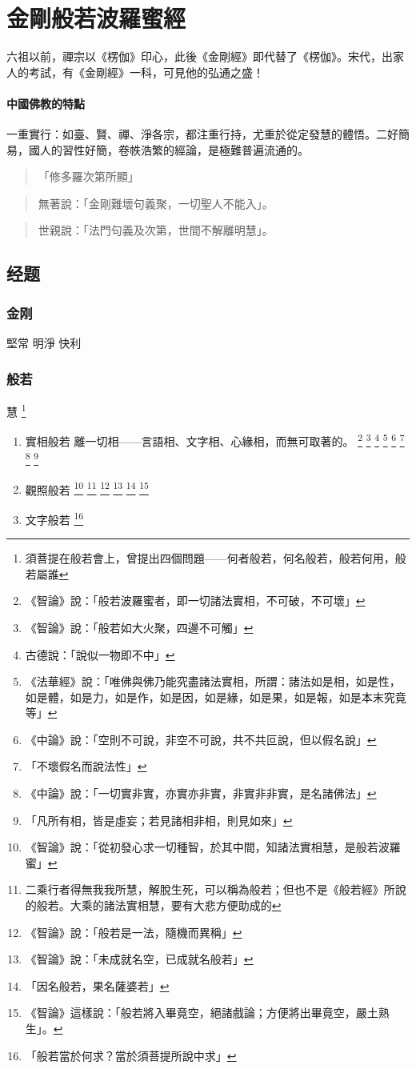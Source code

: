 \section{金剛般若波羅蜜經}
六祖以前，禪宗以《楞伽》印心，此後《金剛經》即代替了《楞伽》。宋代，出家人的考試，有《金剛經》一科，可見他的弘通之盛！
\paragraph{中國佛教的特點}
一重實行：如臺、賢、禪、淨各宗，都注重行持，尤重於從定發慧的體悟。二好簡易，國人的習性好簡，卷帙浩繁的經論，是極難普遍流通的。

\begin{quote}
  「修多羅次第所顯」
\end{quote}

\begin{quote}
  無著說：「金剛難壞句義聚，一切聖人不能入」。
\end{quote}

\begin{quote}
  世親說：「法門句義及次第，世間不解離明慧」。
\end{quote}

\subsection{经题}
\subsubsection{金刚} 堅常 明淨 快利
\subsubsection{般若} 慧 \footnote{須菩提在般若會上，曾提出四個問題——何者般若，何名般若，般若何用，般若屬誰}
\begin{enumerate}
  \item 實相般若 離一切相——言語相、文字相、心緣相，而無可取著的。
    \footnote{《智論》說：「般若波羅蜜者，即一切諸法實相，不可破，不可壞」}
    \footnote{《智論》說：「般若如大火聚，四邊不可觸」}
    \footnote{古德說：「說似一物即不中」}
    \footnote{《法華經》說：「唯佛與佛乃能究盡諸法實相，所謂：諸法如是相，如是性，如是體，如是力，如是作，如是因，如是緣，如是果，如是報，如是本末究竟等」}
    \footnote{《中論》說：「空則不可說，非空不可說，共不共叵說，但以假名說」}
    \footnote{「不壞假名而說法性」}
    \footnote{《中論》說：「一切實非實，亦實亦非實，非實非非實，是名諸佛法」}
    \footnote{「凡所有相，皆是虛妄；若見諸相非相，則見如來」}
  \item 觀照般若
    \footnote{《智論》說：「從初發心求一切種智，於其中間，知諸法實相慧，是般若波羅蜜」}
    \footnote{二乘行者得無我我所慧，解脫生死，可以稱為般若；但也不是《般若經》所說的般若。大乘的諸法實相慧，要有大悲方便助成的}
    \footnote{《智論》說：「般若是一法，隨機而異稱」}
    \footnote{《智論》說：「未成就名空，已成就名般若」}
    \footnote{「因名般若，果名薩婆若」}
    \footnote{《智論》這樣說：「般若將入畢竟空，絕諸戲論；方便將出畢竟空，嚴土熟生」。}
  \item 文字般若 \footnote{「般若當於何求？當於須菩提所說中求」}
\end{enumerate}
